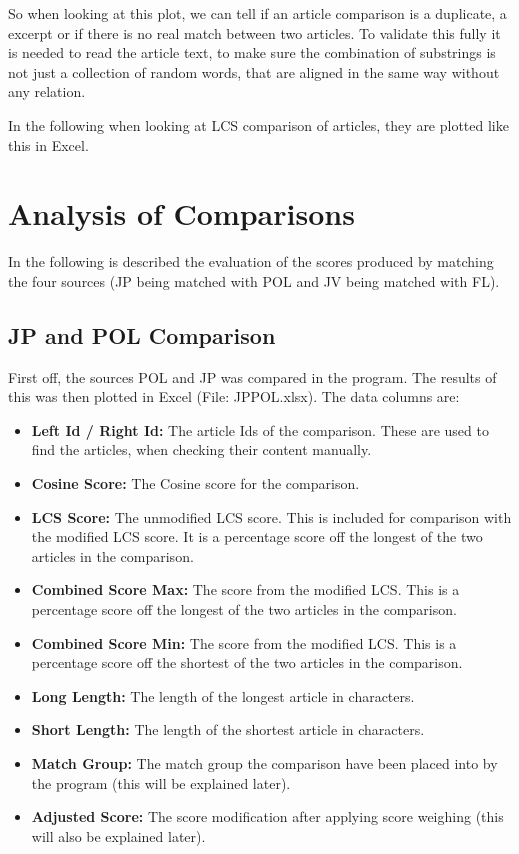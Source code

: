So when looking at this plot, we can tell if an article comparison is a duplicate, a excerpt or if there is no real match between two articles. To validate this fully it is needed to read the article text, to make sure the combination of substrings is not just a collection of random words, that are aligned in the same way without any relation.

In the following when looking at LCS comparison of articles, they are plotted like this in Excel. 

\section{Analysis of Comparisons}
In the following is described the evaluation of the scores produced by matching the four sources (JP being matched with POL and JV being matched with FL).

\subsection{JP and POL Comparison}
First off, the sources POL and JP was compared in the program. The results of this was then plotted in Excel (File: JPPOL.xlsx). The data columns are:

\begin{itemize}
\item \textbf{Left Id / Right Id:} The article Ids of the comparison. These are used to find the articles, when checking their content manually.
\item \textbf{Cosine Score:} The Cosine score for the comparison.
\item \textbf{LCS Score:} The unmodified LCS score. This is included for comparison with the modified LCS score. It is a percentage score off the longest of the two articles in the comparison.
\item \textbf{Combined Score Max:} The score from the modified LCS. This is a percentage score off the longest of the two articles in the comparison.
\item \textbf{Combined Score Min:} The score from the modified LCS. This is a percentage score off the shortest of the two articles in the comparison.
\item \textbf{Long Length:} The length of the longest article in characters.
\item \textbf{Short Length:} The length of the shortest article in characters.
\item \textbf{Match Group:} The match group the comparison have been placed into by the program (this will be explained later).
\item \textbf{Adjusted Score:} The score modification after applying score weighing (this will also be explained later).
\end{itemize}

